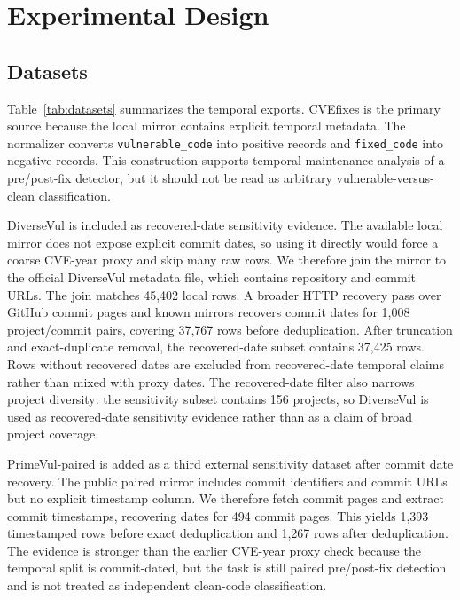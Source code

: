 \documentclass[a4paper,fleqn]{cas-dc}
\begin{document}
\section{Experimental Design}

\subsection{Datasets}

Table~\ref{tab:datasets} summarizes the temporal exports. CVEfixes is the
primary source because the local mirror contains explicit temporal metadata.
The normalizer converts \texttt{vulnerable\_code} into positive records and
\texttt{fixed\_code} into negative records. This construction supports temporal
maintenance analysis of a pre/post-fix detector, but it should not be read as
arbitrary vulnerable-versus-clean classification.

DiverseVul is included as recovered-date sensitivity evidence. The available
local mirror does not expose explicit commit dates, so using it directly would
force a coarse CVE-year proxy and skip many raw rows. We therefore
join the mirror to the official DiverseVul metadata file, which contains
repository and commit URLs. The join matches 45,402 local rows. A broader HTTP
recovery pass over GitHub commit pages and known mirrors recovers commit dates
for 1,008 project/commit pairs, covering 37,767 rows before deduplication. After
truncation and exact-duplicate removal, the recovered-date subset contains
37,425 rows. Rows without recovered dates are excluded from recovered-date
temporal claims rather than mixed with proxy dates. The recovered-date filter
also narrows project diversity: the sensitivity subset contains 156 projects,
so DiverseVul is used as recovered-date sensitivity evidence rather than as a
claim of broad project coverage.

PrimeVul-paired is added as a third external sensitivity dataset after commit
date recovery. The public paired mirror includes commit identifiers and commit
URLs but no explicit timestamp column. We therefore fetch commit pages and
extract commit timestamps, recovering dates for 494 commit pages. This yields
1,393 timestamped rows before exact deduplication and 1,267 rows after
deduplication. The evidence is stronger than the earlier CVE-year proxy check
because the temporal split is commit-dated, but the task is still paired
pre/post-fix detection and is not treated as independent clean-code
classification.
\end{document}
